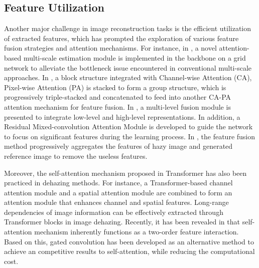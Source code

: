 \documentclass[lettersize,journal]{IEEEtran}
\begin{document}
\subsection{Feature Utilization}
\label{subsec:2.2}
Another major challenge in image reconstruction tasks is the efficient utilization of extracted features, which has prompted the exploration of various feature fusion strategies and attention mechanisms. For instance, in \cite{liu2019griddehazenet}, a novel attention-based multi-scale estimation module is implemented in the backbone on a grid network to alleviate the bottleneck issue encountered in conventional multi-scale approaches. In \cite{qin2020ffa}, a block structure integrated with Channel-wise Attention (CA), Pixel-wise Attention (PA) is stacked to form a group structure, which is progressively triple-stacked and concatenated to feed into another CA-PA attention mechanism for feature fusion. In \cite{zhang2020multi}, a multi-level fusion module is presented to integrate low-level and high-level representations. In addition, a Residual Mixed-convolution Attention Module is developed to guide the network to focus on significant features during the learning process. In \cite{2022selfguided}, the feature fusion method progressively aggregates the features of hazy image and generated reference image to remove the useless features.

Moreover, the self-attention mechanism proposed in Transformer has also been practiced in dehazing methods. For instance, a Transformer-based channel attention module and a spatial attention module are combined to form an attention module that enhances channel and spatial features\cite{gao2022novel}. Long-range dependencies of image information can be effectively extracted through Transformer blocks in image dehazing\cite{yang2022mstfdn}. Recently, it has been revealed in \cite{rao2022hornet} that self-attention mechanism inherently functions as a two-order feature interaction. Based on this, gated convolution has been developed as an alternative method to achieve an competitive results to self-attention, while reducing the computational cost. 
\end{document}

